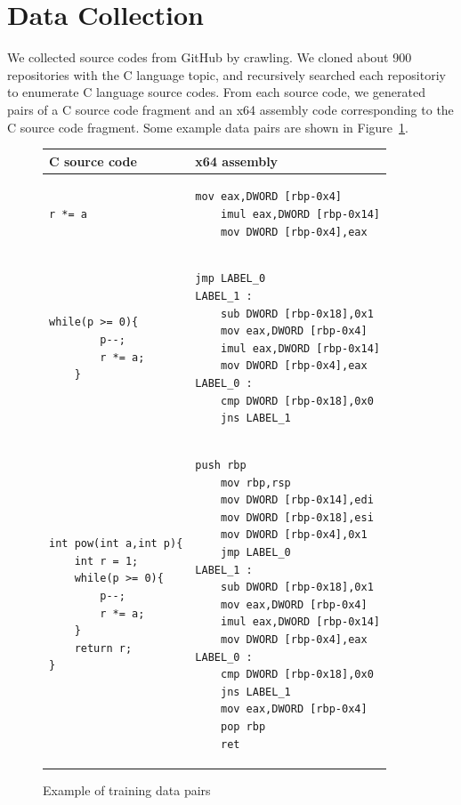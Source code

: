 \documentclass[senior,final,11pt]{iscs-thesis}
\begin{document}
\section{Data Collection}
We collected source codes from GitHub \citep{github} by crawling.
We cloned about 900 repositories with the C language topic, 
and recursively searched each repositoriy to enumerate C language source codes.
From each source code, we generated pairs of a C source code fragment and an x64 assembly code corresponding to the C source code fragment.
Some example data pairs are shown in Figure~\ref{fig:pairsoffragments}. 

\begin{figure}
	\begin{tabular}{|l|l|} \hline
	 C source code & x64 assembly \\ \hline 
		\begin{lstlisting}[style=Csample]
		r *= a
		\end{lstlisting}
		&
		\begin{lstlisting}[style=Asmsample]
	mov eax,DWORD [rbp-0x4]
	imul eax,DWORD [rbp-0x14]
	mov DWORD [rbp-0x4],eax
		\end{lstlisting} \\ \hline	
		\begin{lstlisting}[style=Csample]
	while(p >= 0){
		p--;
		r *= a;
	}
		\end{lstlisting}
		&
		\begin{lstlisting}[style=Asmsample]
	jmp LABEL_0
LABEL_1 :
	sub DWORD [rbp-0x18],0x1
	mov eax,DWORD [rbp-0x4]
	imul eax,DWORD [rbp-0x14]
	mov DWORD [rbp-0x4],eax
LABEL_0 :
	cmp DWORD [rbp-0x18],0x0
	jns LABEL_1
		\end{lstlisting} \\ \hline		
		\begin{lstlisting}[style=Csample]
int pow(int a,int p){
	int r = 1;
	while(p >= 0){
		p--;
		r *= a;
	}
	return r;
}
		\end{lstlisting}
		&
		\begin{lstlisting}[style=Asmsample]
	push rbp
	mov rbp,rsp
	mov DWORD [rbp-0x14],edi
	mov DWORD [rbp-0x18],esi
	mov DWORD [rbp-0x4],0x1
	jmp LABEL_0
LABEL_1 :
	sub DWORD [rbp-0x18],0x1
	mov eax,DWORD [rbp-0x4]
	imul eax,DWORD [rbp-0x14]
	mov DWORD [rbp-0x4],eax
LABEL_0 :
	cmp DWORD [rbp-0x18],0x0
	jns LABEL_1
	mov eax,DWORD [rbp-0x4]
	pop rbp
	ret
		\end{lstlisting} \\ \hline
	\end{tabular}
	\caption{Example of training data pairs}
	\label{fig:pairsoffragments}
\end{figure}
\end{document}
